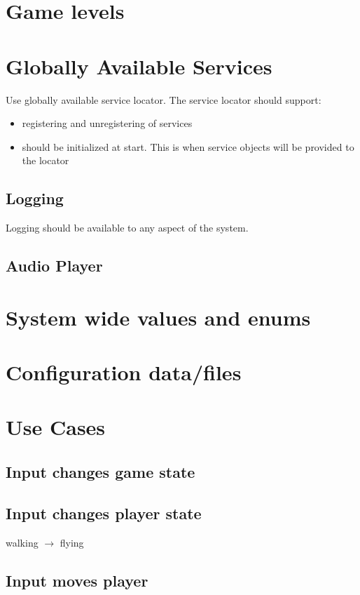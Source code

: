 \documentclass[12pt]{article}
\begin{document}
\section{	Game levels}

\section{ Globally Available Services}
Use globally available service locator.  The service locator should support:
\begin{itemize}
	\item registering and unregistering of services
	\item should be initialized at start.  This is when service objects will be provided to the locator
\end{itemize}

\subsection{ Logging }
Logging should be available to any aspect of the system. 
\subsection{ Audio Player} 

\section{	System wide values and enums}

\section{	Configuration data/files}

\section{Use Cases}
\subsection{Input changes game state}
\subsection{Input changes player state}
walking $\rightarrow$ flying
\subsection{Input moves player}
\end{document}
